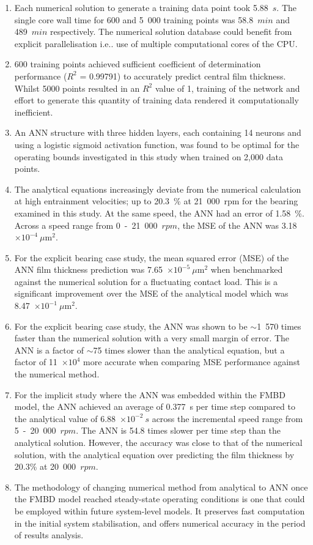 \begin{enumerate}
	\item Each numerical solution to generate a training data point took 5.88~$s$. The single core wall time for 600 and 5~000 training points was 58.8~$min$ and 489~$min$ respectively. The numerical solution database could benefit from explicit parallelisation i.e.. use of multiple computational cores of the CPU. 
	\item 600 training points achieved sufficient coefficient of determination performance ($R^2$ = 0.99791) to accurately predict central film thickness. Whilst 5000 points resulted in an $R^2$ value of 1, training of the network and effort to generate this quantity of training data rendered it computationally inefficient.
	\item An ANN structure with three hidden layers, each containing 14 neurons and using a logistic sigmoid activation function, was found to be optimal for the operating bounds investigated in this study when trained on 2,000 data points.
	\item The analytical equations increasingly deviate from the numerical calculation at high entrainment velocities; up to 20.3~\% at 21~000~rpm for the bearing examined in this study. At the same speed, the ANN had an error of 1.58~\%. Across a speed range from 0~-~21~000~$rpm$, the MSE of the ANN was 3.18~$\times 10^{-4}~\mu \mathrm{m}^2$.
	\item For the explicit bearing case study, the mean squared error (MSE) of the ANN film thickness prediction was 7.65~$\times 10^{-5}~\mu \mathrm{m}^2$ when benchmarked against the numerical solution for a fluctuating contact load. This is a significant improvement over the MSE of the analytical model which was 8.47~$\times 10^{-1}~\mu\mathrm{m}^2$.
	\item For the explicit bearing case study, the ANN was shown to be $\sim$1~570 times faster than the numerical solution with a very small margin of error. The ANN is a factor of $\sim$75 times slower than the analytical equation, but a factor of 11~$\times 10^{4}$ more accurate when comparing MSE performance against the numerical method.
	\item For the implicit study where the ANN was embedded within the FMBD model, the ANN achieved an average of 0.377~s per time step compared to the analytical value of 6.88~$\times 10^{-2}~s$ across the incremental speed range from 5~-~20~000~$rpm$. The ANN is 54.8 times slower per time step than the analytical solution. However, the accuracy was close to that of the numerical solution, with the analytical equation over predicting the film thickness by 20.3\% at 20~000~$rpm$.
	\item The methodology of changing numerical method from analytical to ANN once the FMBD model reached steady-state operating conditions is one that could be employed within future system-level models. It preserves fast computation in the initial system stabilisation, and offers numerical accuracy in the period of results analysis.
\end{enumerate}

